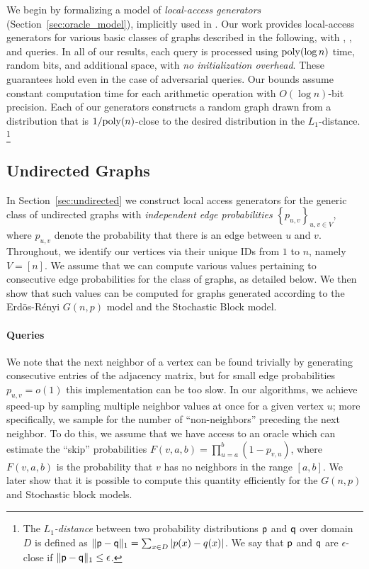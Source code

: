 We begin by formalizing a model of {\em local-access generators} (Section~\ref{sec:oracle_model}), implicitly used in \cite{reut}.
Our work provides local-access generators for various basic classes of graphs described in the following, with 
, , and  queries.
In all of our results, each query is processed using $\mathrm{poly}(\log n)$ time, random bits, and additional space, with \emph{no initialization overhead}.
These guarantees hold even in the case of adversarial queries.
Our bounds assume constant computation time for each arithmetic operation with $O(\log n)$-bit precision.
Each of our generators constructs a random graph drawn from a distribution that is $1/\mathrm{poly}(n)$-close to the desired distribution in the $L_1$-distance.
\footnote{The \emph{$L_1$-distance} between two probability distributions $\mathsf{p}$ and $\mathsf{q}$ over domain $D$
is defined as $\|\mathsf{p-q}\|_1 = \sum_{x \in D } |p(x)-q(x)|$.
We say that $\mathsf{p}$ and $\mathsf{q}$ are $\epsilon$-close if $\|\mathsf{p-q}\|_1 \leq \epsilon$.}



\subsection{Undirected Graphs}
\label{sec:undirected_graphs}
In Section~\ref{sec:undirected} we construct local access generators for the generic
class of undirected graphs
with {\em independent edge probabilities} $\left\{ p_{u,v} \right\}_{u,v\in V}$,
where $p_{u,v}$ denote the probability that there is an edge between $u$ and $v$.
Throughout, we identify our vertices via their unique IDs from $1$ to $n$, namely $V = [n]$.
We assume that we can compute various values pertaining to consecutive
edge probabilities for the class of graphs, as detailed below.
We then show that such values can be computed for graphs
generated according to the Erd\"{o}s-R\'{e}nyi $G(n,p)$ model
and the Stochastic Block model.

\paragraph*{ Queries}
\label{par:next_neighbor_queries}
We note that the next neighbor of a vertex can be found trivially by generating consecutive
entries of the adjacency matrix, but for small edge probabilities $p_{u,v} = o(1)$
this implementation can be too slow.  In our algorithms, we achieve speed-up by sampling multiple 
neighbor values at once for a given vertex $u$; more specifically,  
we sample for the number of ``non-neighbors'' preceding
the next neighbor.
To do this, we assume that we have access to
an oracle which can estimate the ``skip'' probabilities 
$F(v,a,b)=\prod^{b}_{u=a} (1-p_{v,u})$,
where $F(v,a,b)$ is the probability that $v$ 
has no neighbors in the range $[a,b]$.
We later show that it is possible to compute this quantity efficiently
for the $G(n,p)$ and Stochastic block models.

